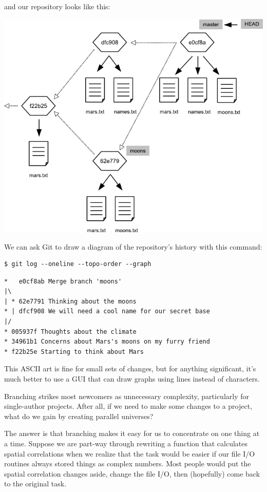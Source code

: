 \documentclass{book}
\begin{document}
and our repository looks like this:

\includegraphics{novice/extras/img/git-branching-06.png}

We can ask Git to draw a diagram of the repository's history with this
command:

\begin{verbatim}
$ git log --oneline --topo-order --graph
\end{verbatim}

\begin{verbatim}
*   e0cf8ab Merge branch 'moons'
|\
| * 62e7791 Thinking about the moons
* | dfcf908 We will need a cool name for our secret base
|/
* 005937f Thoughts about the climate
* 34961b1 Concerns about Mars's moons on my furry friend
* f22b25e Starting to think about Mars
\end{verbatim}

This ASCII art is fine for small sets of changes, but for anything
significant, it's much better to use a GUI that can draw graphs using
lines instead of characters.

Branching strikes most newcomers as unnecessary complexity, particularly
for single-author projects. After all, if we need to make some changes
to a project, what do we gain by creating parallel universes?

The answer is that branching makes it easy for us to concentrate on one
thing at a time. Suppose we are part-way through rewriting a function
that calculates spatial correlations when we realize that the task would
be easier if our file I/O routines always stored things as complex
numbers. Most people would put the spatial correlation changes aside,
change the file I/O, then (hopefully) come back to the original task.
\end{document}
